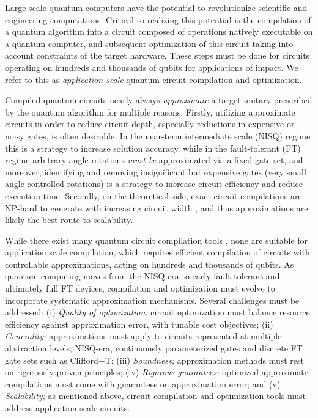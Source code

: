 
\noindent Large-scale quantum computers have the potential to revolutionize
scientific and engineering computations. Critical to realizing
this potential is the compilation of a quantum
algorithm into a circuit composed of operations natively executable on a quantum computer, and subsequent optimization of this circuit taking into account constraints of the target hardware. These steps must be done for circuits operating on hundreds and thousands of qubits for applications of impact. We refer to this
as \emph{application scale} quantum circuit compilation and optimization. 

Compiled quantum circuits nearly always \emph{approximate} a target unitary prescribed by the quantum algorithm for multiple reasons. 
Firstly, utilizing approximate circuits
in order to reduce circuit depth, especially reductions in expensive
or noisy gates, is often desirable. In the near-term intermediate scale (NISQ) \cite{Preskill2018_NISQ} regime this is a
strategy to increase solution accuracy, while in the
fault-tolerant (FT) regime arbitrary angle rotations \emph{must be}
approximated via a fixed gate-set, and moreover, identifying and
removing insignificant but expensive gates (\eg very small angle
controlled rotations) is a strategy to increase circuit efficiency and
reduce execution time. Secondly, on the theoretical side, exact
circuit compilations are NP-hard to generate with increasing circuit
width \cite{botea2018complexity}, and thus approximations are likely
the best route to scalability.

While there exist many quantum circuit compilation tools \cite{qiskit,bqskit,tket,cirq,qdrift},
none are suitable for application scale compilation, which requires
efficient compilation of circuits with controllable approximations, acting on hundreds and thousands of
qubits. As quantum computing moves from the NISQ
era to early fault-tolerant \cite{PRXQuantum.5.020101} and ultimately full FT devices,
compilation and optimization must evolve to incorporate systematic
approximation mechanisms. Several challenges must be addressed: (i) {\it Quality of optimization:} circuit optimization must balance resource efficiency against approximation error, with tunable cost objectives; (ii) {\it Generality:} approximations must apply to circuits represented at multiple abstraction levels; NISQ-era, continuously parameterized gates and discrete FT gate sets such as Clifford+T; (iii) {\it Soundness;} approximation methods must rest on rigorously proven principles; (iv) {\it Rigorous guarantees:} optimized approximate compilations must come with guarantees on approximation error; and (v) {\it Scalability;} as mentioned above, circuit compilation and optimization tools must address application scale circuits. 

